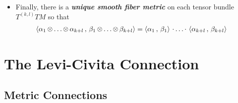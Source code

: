 \documentclass[11pt]{article}
\begin{document}
\begin{itemize}
\item Finally, there is a \emph{\textbf{unique smooth fiber metric}} on each tensor bundle $T^{(k,l)}TM$ so that 
\begin{align}
\left\langle \alpha_1 \,{\otimes}\ldots{\otimes}\, \alpha_{k+l}\,,\, \beta_1 \,{\otimes}\ldots{\otimes}\, \beta_{k+l} \right\rangle &= \left\langle \alpha_1\,,\, \beta_1 \right\rangle \,{\cdot}\ldots{\cdot}\, \left\langle \alpha_{k+l}\,,\, \beta_{k+l} \right\rangle \label{eqn: inner_product_tensor}
\end{align}
\end{itemize}

\section{The Levi-Civita Connection}
\subsection{Metric Connections}
\end{document}
